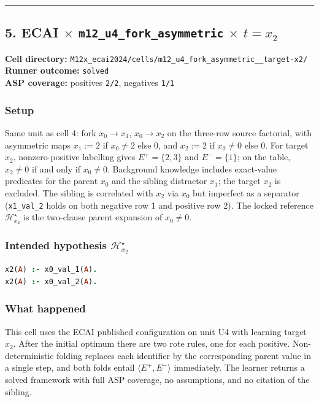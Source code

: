 \documentclass[11pt]{article}
\begin{document}
\medskip\hrule\medskip

\subsection{\texorpdfstring{5. ECAI \(\times\) \texttt{m12\_u4\_fork\_asymmetric} \(\times\) \(t=x_2\)}{5. ECAI - m12-u4-fork-asymmetric - target x2}}

\textbf{Cell directory:} \texttt{M12x\_ecai2024/cells/m12\_u4\_fork\_asymmetric\_\_target-x2/}\\
\textbf{Runner outcome:} \texttt{solved}\\
\textbf{ASP coverage:} positives \texttt{2/2}, negatives \texttt{1/1}

\subsubsection{Setup}

Same unit as cell 4: fork \(x_0\to x_1\), \(x_0\to x_2\) on the three-row source factorial, with asymmetric maps \(x_1:=2\) if \(x_0\neq 2\) else \(0\), and \(x_2:=2\) if \(x_0\neq 0\) else \(0\). For target \(x_2\), nonzero-positive labelling gives \(E^+=\{2,3\}\) and \(E^-=\{1\}\); on the table, \(x_2\neq 0\) if and only if \(x_0\neq 0\). Background knowledge includes exact-value predicates for the parent \(x_0\) and the sibling distractor \(x_1\); the target \(x_2\) is excluded. The sibling is correlated with \(x_2\) via \(x_0\) but imperfect as a separator (\texttt{x1\_val\_2} holds on both negative row 1 and positive row 2). The locked reference \(\mathcal{H}_{x_2}^\star\) is the two-clause parent expansion of \(x_0\neq 0\).

\subsubsection{\texorpdfstring{Intended hypothesis \(\mathcal{H}_{x_2}^\star\)}{Intended hypothesis H-star(x2)}}

\begin{lstlisting}[style=logic,language=Prolog]
x2(A) :- x0_val_1(A).
x2(A) :- x0_val_2(A).
\end{lstlisting}

\subsubsection{What happened}

This cell uses the ECAI published configuration on unit U4 with learning target \(x_2\). After the initial optimum there are two rote rules, one for each positive. Non-deterministic folding replaces each identifier by the corresponding parent value in a single step, and both folds entail \(\langle E^+,E^-\rangle\) immediately. The learner returns a solved framework with full ASP coverage, no assumptions, and no citation of the sibling.
\end{document}

